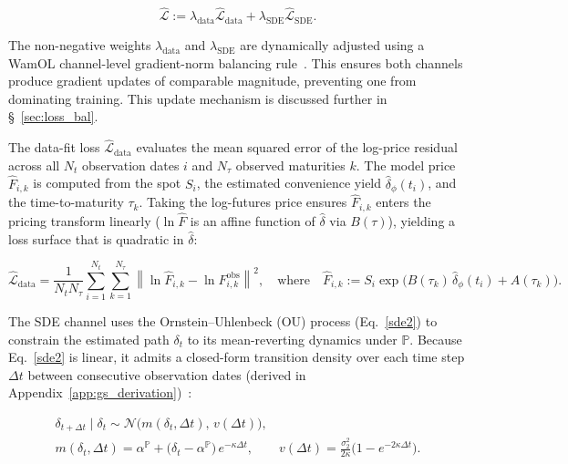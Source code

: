 \documentclass[11pt, a4paper]{article}
\begin{document}
\begin{equation}
\hat{\mathcal{L}} :=
\lambda_{\text{data}} \hat{\mathcal{L}}_{\text{data}}
+ \lambda_{\text{SDE}} \hat{\mathcal{L}}_{\text{SDE}}.
\label{eq:composite}
\end{equation}

The non-negative weights $\lambda_{\text{data}}$ and $\lambda_{\text{SDE}}$ are dynamically adjusted using a WamOL channel-level gradient-norm balancing rule~\cite{Hoshisashi2024Physics-InformedPDEs}. This ensures both channels produce gradient updates of comparable magnitude, preventing one from dominating training. This update mechanism is discussed further in \S~\ref{sec:loss_bal}.

The data-fit loss $\hat{\mathcal{L}}_{\text{data}}$ evaluates the mean squared error of the log-price residual across all $N_t$ observation dates $i$ and $N_\tau$ observed maturities $k$. The model price $\hat{F}_{i,k}$ is computed from the spot $S_i$, the estimated convenience yield $\hat{\delta}_\phi(t_i)$, and the time-to-maturity $\tau_k$. Taking the log-futures price ensures $\hat{F}_{i,k}$ enters the pricing transform linearly ($\ln\hat{F}$ is an affine function of $\hat{\delta}$ via $B(\tau)$), yielding a loss surface that is quadratic in $\hat{\delta}$:

\begin{equation}
    \hat{\mathcal{L}}_{\text{data}} = \frac{1}{N_t N_\tau} \sum_{i=1}^{N_t} \sum_{k=1}^{N_\tau} \left\lVert \ln \hat{F}_{i,k} - \ln F^{\text{obs}}_{i,k} \right\rVert^2, \quad \text{where} \quad \hat{F}_{i,k} := S_i \exp\!\big( B(\tau_k)\,\hat{\delta}_\phi(t_i) + A(\tau_k) \big).
    \label{eq:data-loss}
\end{equation}

The SDE channel uses the Ornstein--Uhlenbeck (OU) process (Eq.~\ref{sde2}) to constrain the estimated path $\delta_t$ to its mean-reverting dynamics under $\mathbb{P}$. Because Eq.~\ref{sde2} is linear, it admits a closed-form transition density over each time step $\Delta t$ between consecutive observation dates (derived in Appendix~\ref{app:gs_derivation})~\cite{Schwartz1997TheHedging, vasicek1977equilibrium}:

\begin{equation}
\begin{gathered}
  \delta_{t+\Delta t} \mid \delta_t \sim \mathcal{N}\!\big(m(\delta_t, \Delta t),\, v(\Delta t)\big), \\
  m(\delta_t, \Delta t) = \alpha^{\mathbb{P}} + \big(\delta_t - \alpha^{\mathbb{P}}\big)\,e^{-\kappa \Delta t}, \qquad
  v(\Delta t) = \frac{\sigma_2^2}{2\kappa} \Big(1 - e^{-2\kappa \Delta t}\Big).
\end{gathered}
\end{equation}
\end{document}
